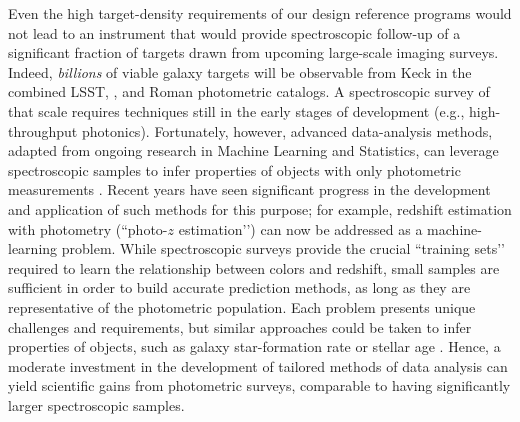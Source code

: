 \documentclass[11pt,a4paper,twoside,onecolumn,openany,final,oldfontcommands]{memoir}
\begin{document}




Even the high target-density requirements of our design reference programs would not lead to an instrument that would provide spectroscopic follow-up of a significant fraction of targets drawn from upcoming large-scale imaging surveys.  Indeed, {\it billions} of viable galaxy targets will be observable from Keck in the combined LSST, \euclid, and Roman photometric catalogs.  A spectroscopic survey of that scale requires techniques still in the early stages of development (e.g., high-throughput photonics).  Fortunately, however, advanced data-analysis methods, adapted from ongoing research in Machine Learning and Statistics, can leverage spectroscopic samples to infer properties of objects with only photometric measurements \citep[e.g.][]{hemmati19}. Recent years have seen significant progress in the development and application of such methods for this purpose; for example, redshift estimation with photometry (``photo-$z$ estimation’’) can now be addressed as a machine-learning problem. While spectroscopic surveys provide the crucial ``training sets’’ required to learn the relationship between colors and redshift, small samples are sufficient in order to build accurate prediction methods, as long as they are representative of the photometric population. Each problem presents unique challenges and requirements, but similar approaches could be taken to infer properties of objects, such as galaxy star-formation rate or stellar age \citep[e.g.][]{TingPayne19}. Hence, a moderate investment in the development of tailored methods of data analysis can yield scientific gains from photometric surveys, comparable to having significantly larger spectroscopic samples.
\end{document}
